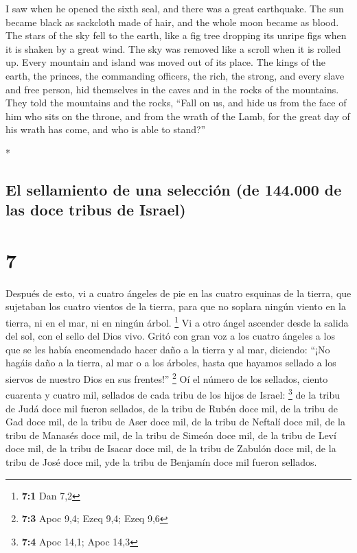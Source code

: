 \begin{paracol}{2}
\begin{otherlanguage}{english}
 I saw when he opened the sixth seal, and there was a
great earthquake. The sun became black as sackcloth made of hair, and
the whole moon became as blood.  The stars of the sky
fell to the earth, like a fig tree dropping its unripe figs when it is
shaken by a great wind.  The sky was removed like a
scroll when it is rolled up. Every mountain and island was moved out of
its place.  The kings of the earth, the princes, the
commanding officers, the rich, the strong, and every slave and free
person, hid themselves in the caves and in the rocks of the mountains.
 They told the mountains and the rocks, ``Fall on us, and
hide us from the face of him who sits on the throne, and from the wrath
of the Lamb,  for the great day of his wrath has come,
and who is able to stand?''

\end{otherlanguage}

\switchcolumn[0]*

\hypertarget{el-sellamiento-de-una-selecciuxf3n-de-144.000-de-las-doce-tribus-de-israel}{%
\subsection{El sellamiento de una selección (de 144.000 de las doce
tribus de
Israel)}\label{el-sellamiento-de-una-selecciuxf3n-de-144.000-de-las-doce-tribus-de-israel}}

\hypertarget{section-12}{%
\section{7}\label{section-12}}

 Después de esto, vi a cuatro ángeles de pie en las cuatro
esquinas de la tierra, que sujetaban los cuatro vientos de la tierra,
para que no soplara ningún viento en la tierra, ni en el mar, ni en
ningún árbol. \footnote{\textbf{7:1} Dan 7,2}  Vi a otro
ángel ascender desde la salida del sol, con el sello del Dios vivo.
Gritó con gran voz a los cuatro ángeles a los que se les había
encomendado hacer daño a la tierra y al mar,  diciendo:
``¡No hagáis daño a la tierra, al mar o a los árboles, hasta que hayamos
sellado a los siervos de nuestro Dios en sus frentes!'' \footnote{\textbf{7:3}
  Apoc 9,4; Ezeq 9,4; Ezeq 9,6}  Oí el número de los
sellados, ciento cuarenta y cuatro mil, sellados de cada tribu de los
hijos de Israel: \footnote{\textbf{7:4} Apoc 14,1; Apoc 14,3}
 de la tribu de Judá doce mil fueron sellados, de la tribu
de Rubén doce mil, de la tribu de Gad doce mil,  de la
tribu de Aser doce mil, de la tribu de Neftalí doce mil, de la tribu de
Manasés doce mil,  de la tribu de Simeón doce mil, de la
tribu de Leví doce mil, de la tribu de Isacar doce mil, 
de la tribu de Zabulón doce mil, de la tribu de José doce mil, yde la
tribu de Benjamín doce mil fueron sellados.


\end{paracol}
